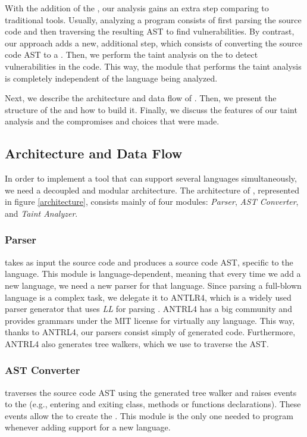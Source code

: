 With the addition of the \astname{}, our analysis gains an extra step comparing to traditional tools. Usually, analyzing a program consists of first parsing the source code and then traversing the resulting AST to find vulnerabilities. By contrast, our approach adds a new, additional step, which consists of converting the source code AST to a \astname{}. Then, we perform the taint analysis on the \astname{} to detect vulnerabilities in the code. This way, the module that performs the taint analysis is completely independent of the language being analyzed. 

Next, we describe the architecture and data flow of \toolname{}. Then, we present the  structure of the \astname{} and how to build it. Finally, we discuss the features of our taint analysis and the compromises and choices that were made.

\subsection{Architecture and Data Flow}

In order to implement a tool that can support several languages simultaneously, we need a decoupled and modular architecture. The architecture of \toolname{}, represented in figure \ref{architecture}, consists mainly of four modules: \textit{Parser}, \textit{AST Converter}, \astbuilder{} and \textit{Taint Analyzer}.


\subsubsection{Parser} takes as input the source code and produces a source code AST, specific to the language. This module is language-dependent, meaning that every time we add a new language, we need a new parser for that language. Since parsing a full-blown language is a complex task, we delegate it to ANTLR4, which is a widely used parser generator that uses \textit{LL} for parsing \cite{antlr4book}. ANTRL4 has a big community and provides grammars under the MIT license for virtually any language. This way, thanks to ANTRL4, our parsers consist simply of generated code. Furthermore, ANTRL4 also generates tree walkers, which we use to traverse the AST.

\subsubsection{AST Converter} traverses the source code AST using the generated tree walker and raises events to the \astbuilder{} (e.g., entering and exiting class, methods or functions declarations). These events allow the \astbuilder{} to create the \astname{}. This module is the only one needed to program whenever adding support for a new language.

